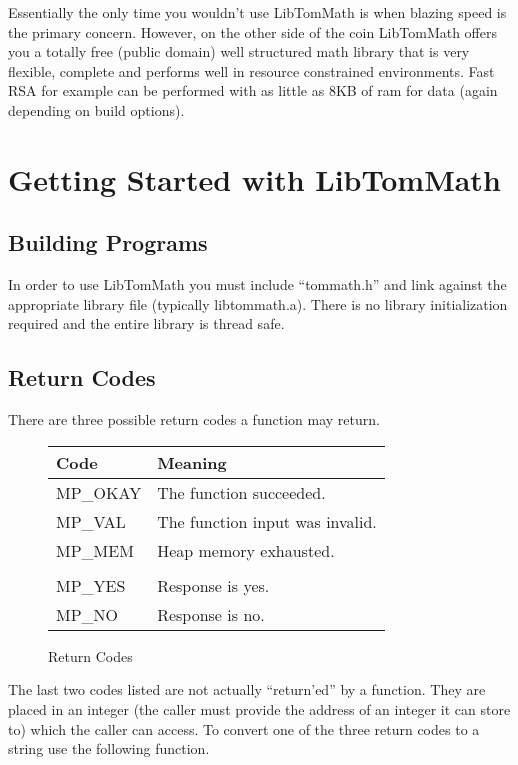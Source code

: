 \documentclass[synpaper]{book}
\begin{document}
Essentially the only time you wouldn't use LibTomMath is when blazing speed is the primary concern.  However,
on the other side of the coin LibTomMath offers you a totally free (public domain) well structured math library
that is very flexible, complete and performs well in resource constrained environments.  Fast RSA for example can
be performed with as little as 8KB of ram for data (again depending on build options).

\chapter{Getting Started with LibTomMath}
\section{Building Programs}
In order to use LibTomMath you must include ``tommath.h'' and link against the appropriate library file (typically
libtommath.a).  There is no library initialization required and the entire library is thread safe.

\section{Return Codes}
There are three possible return codes a function may return.

\begin{figure}[h!]
\begin{center}
\begin{small}
\begin{tabular}{|l|l|}
\hline \textbf{Code} & \textbf{Meaning} \\
\hline MP\_OKAY & The function succeeded. \\
\hline MP\_VAL  & The function input was invalid. \\
\hline MP\_MEM  & Heap memory exhausted. \\
\hline &\\
\hline MP\_YES  & Response is yes. \\
\hline MP\_NO   & Response is no. \\
\hline
\end{tabular}
\end{small}
\end{center}
\caption{Return Codes}
\end{figure}

The last two codes listed are not actually ``return'ed'' by a function.  They are placed in an integer (the caller must
provide the address of an integer it can store to) which the caller can access.  To convert one of the three return codes
to a string use the following function.
\end{document}
